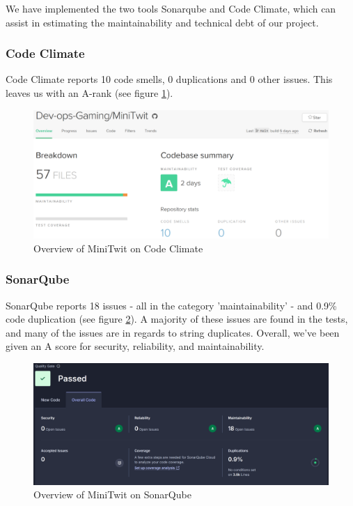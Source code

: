 We have implemented the two tools Sonarqube and Code Climate, which can assist in estimating the maintainability and technical debt of our project.
\subsubsection{Code Climate}
Code Climate reports 10 code smells, 0 duplications and 0 other issues. This leaves us with an A-rank (see figure \ref{fig:CodeClimate}).\\
\begin{figure}[H]
\centering
\includegraphics[width=\textwidth]{images/code_climate.png}
\caption{Overview of MiniTwit on Code Climate}
\label{fig:CodeClimate}
\end{figure}

\subsubsection{SonarQube}
SonarQube reports 18 issues - all in the category 'maintainability' - and 0.9\% code duplication (see figure \ref{fig:SonarQube}). A majority of these issues are found in the tests, and many of the issues are in regards to string duplicates. Overall, we've been given an A score for security, reliability, and maintainability.
\begin{figure}[h]
\centering
\includegraphics[width=\textwidth]{images/sonarQube.png}
\caption{Overview of MiniTwit on SonarQube}
\label{fig:SonarQube}
\end{figure}